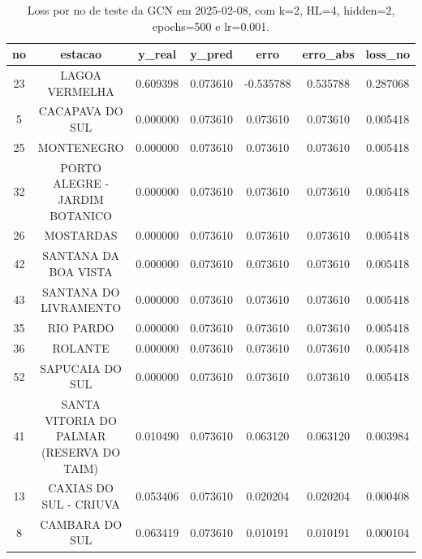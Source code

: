 \begin{table}[h]
\centering
\caption{Loss por no de teste da GCN em 2025-02-08, com k=2, HL=4, hidden=2, epochs=500 e lr=0.001.}
\label{tab:gcn_loss_k2_hl4_h2_e500_d20250208}
\begin{tabular}{ccccccc}
\toprule
no & estacao & y\_real & y\_pred & erro & erro\_abs & loss\_no \\
\midrule
23 & LAGOA VERMELHA & 0.609398 & 0.073610 & -0.535788 & 0.535788 & 0.287068 \\
5 & CACAPAVA DO SUL & 0.000000 & 0.073610 & 0.073610 & 0.073610 & 0.005418 \\
25 & MONTENEGRO & 0.000000 & 0.073610 & 0.073610 & 0.073610 & 0.005418 \\
32 & PORTO ALEGRE - JARDIM BOTANICO & 0.000000 & 0.073610 & 0.073610 & 0.073610 & 0.005418 \\
26 & MOSTARDAS & 0.000000 & 0.073610 & 0.073610 & 0.073610 & 0.005418 \\
42 & SANTANA DA BOA VISTA & 0.000000 & 0.073610 & 0.073610 & 0.073610 & 0.005418 \\
43 & SANTANA DO LIVRAMENTO & 0.000000 & 0.073610 & 0.073610 & 0.073610 & 0.005418 \\
35 & RIO PARDO & 0.000000 & 0.073610 & 0.073610 & 0.073610 & 0.005418 \\
36 & ROLANTE & 0.000000 & 0.073610 & 0.073610 & 0.073610 & 0.005418 \\
52 & SAPUCAIA DO SUL & 0.000000 & 0.073610 & 0.073610 & 0.073610 & 0.005418 \\
41 & SANTA VITORIA DO PALMAR (RESERVA DO TAIM) & 0.010490 & 0.073610 & 0.063120 & 0.063120 & 0.003984 \\
13 & CAXIAS DO SUL - CRIUVA & 0.053406 & 0.073610 & 0.020204 & 0.020204 & 0.000408 \\
8 & CAMBARA DO SUL & 0.063419 & 0.073610 & 0.010191 & 0.010191 & 0.000104 \\
\bottomrule
\end{tabular}
\end{table}
